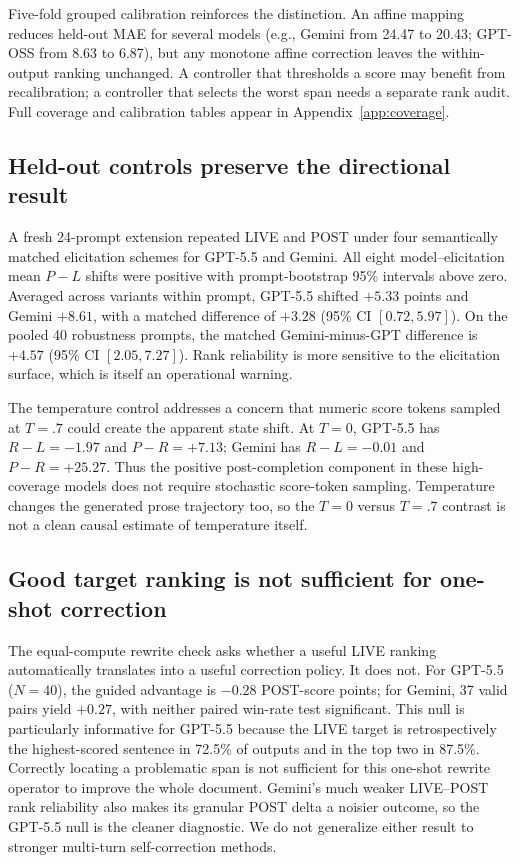 Five-fold grouped calibration reinforces the distinction. An affine mapping reduces held-out MAE for several models (e.g., Gemini from 24.47 to 20.43; GPT-OSS from 8.63 to 6.87), but any monotone affine correction leaves the within-output ranking unchanged. A controller that thresholds a score may benefit from recalibration; a controller that selects the worst span needs a separate rank audit. Full coverage and calibration tables appear in Appendix~\ref{app:coverage}.

\subsection{Held-out controls preserve the directional result}
A fresh 24-prompt extension repeated LIVE and POST under four semantically matched elicitation schemes for GPT-5.5 and Gemini. All eight model--elicitation mean $P-L$ shifts were positive with prompt-bootstrap 95\% intervals above zero. Averaged across variants within prompt, GPT-5.5 shifted $+5.33$ points and Gemini $+8.61$, with a matched difference of $+3.28$ (95\% CI $[0.72,5.97]$). On the pooled 40 robustness prompts, the matched Gemini-minus-GPT difference is $+4.57$ (95\% CI $[2.05,7.27]$). Rank reliability is more sensitive to the elicitation surface, which is itself an operational warning.

The temperature control addresses a concern that numeric score tokens sampled at $T=.7$ could create the apparent state shift. At $T=0$, GPT-5.5 has $R-L=-1.97$ and $P-R=+7.13$; Gemini has $R-L=-0.01$ and $P-R=+25.27$. Thus the positive post-completion component in these high-coverage models does not require stochastic score-token sampling. Temperature changes the generated prose trajectory too, so the $T=0$ versus $T=.7$ contrast is not a clean causal estimate of temperature itself.

\subsection{Good target ranking is not sufficient for one-shot correction}
The equal-compute rewrite check asks whether a useful LIVE ranking automatically translates into a useful correction policy. It does not. For GPT-5.5 ($N=40$), the guided advantage is $-0.28$ POST-score points; for Gemini, 37 valid pairs yield $+0.27$, with neither paired win-rate test significant. This null is particularly informative for GPT-5.5 because the LIVE target is retrospectively the highest-scored sentence in 72.5\% of outputs and in the top two in 87.5\%. Correctly locating a problematic span is not sufficient for this one-shot rewrite operator to improve the whole document. Gemini's much weaker LIVE--POST rank reliability also makes its granular POST delta a noisier outcome, so the GPT-5.5 null is the cleaner diagnostic. We do not generalize either result to stronger multi-turn self-correction methods.

